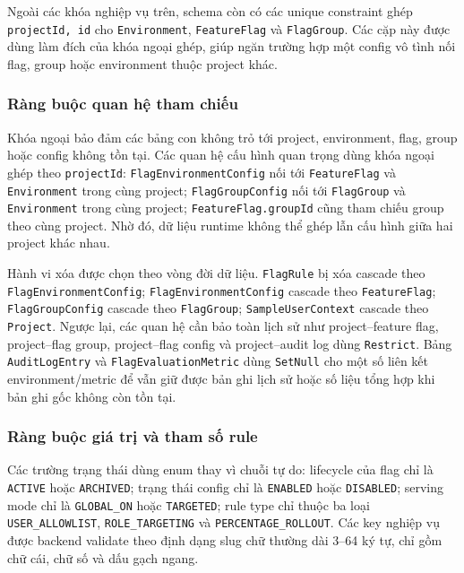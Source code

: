 Ngoài các khóa nghiệp vụ trên, schema còn có các unique constraint ghép \texttt{projectId, id} cho \texttt{Environment}, \texttt{FeatureFlag} và \texttt{FlagGroup}. Các cặp này được dùng làm đích của khóa ngoại ghép, giúp ngăn trường hợp một config vô tình nối flag, group hoặc environment thuộc project khác.

\subsubsection{Ràng buộc quan hệ tham chiếu}

Khóa ngoại bảo đảm các bảng con không trỏ tới project, environment, flag, group hoặc config không tồn tại. Các quan hệ cấu hình quan trọng dùng khóa ngoại ghép theo \texttt{projectId}: \texttt{FlagEnvironmentConfig} nối tới \texttt{FeatureFlag} và \texttt{Environment} trong cùng project; \texttt{FlagGroupConfig} nối tới \texttt{FlagGroup} và \texttt{Environment} trong cùng project; \texttt{FeatureFlag.groupId} cũng tham chiếu group theo cùng project. Nhờ đó, dữ liệu runtime không thể ghép lẫn cấu hình giữa hai project khác nhau.

Hành vi xóa được chọn theo vòng đời dữ liệu. \texttt{FlagRule} bị xóa cascade theo \texttt{FlagEnvironmentConfig}; \texttt{FlagEnvironmentConfig} cascade theo \texttt{FeatureFlag}; \texttt{FlagGroupConfig} cascade theo \texttt{FlagGroup}; \texttt{SampleUserContext} cascade theo \texttt{Project}. Ngược lại, các quan hệ cần bảo toàn lịch sử như project--feature flag, project--flag group, project--flag config và project--audit log dùng \texttt{Restrict}. Bảng \texttt{AuditLogEntry} và \texttt{FlagEvaluationMetric} dùng \texttt{SetNull} cho một số liên kết environment/metric để vẫn giữ được bản ghi lịch sử hoặc số liệu tổng hợp khi bản ghi gốc không còn tồn tại.

\subsubsection{Ràng buộc giá trị và tham số rule}

Các trường trạng thái dùng enum thay vì chuỗi tự do: lifecycle của flag chỉ là \texttt{ACTIVE} hoặc \texttt{ARCHIVED}; trạng thái config chỉ là \texttt{ENABLED} hoặc \texttt{DISABLED}; serving mode chỉ là \texttt{GLOBAL\_ON} hoặc \texttt{TARGETED}; rule type chỉ thuộc ba loại \texttt{USER\_ALLOWLIST}, \texttt{ROLE\_TARGETING} và \texttt{PERCENTAGE\_ROLLOUT}. Các key nghiệp vụ được backend validate theo định dạng slug chữ thường dài 3--64 ký tự, chỉ gồm chữ cái, chữ số và dấu gạch ngang.


